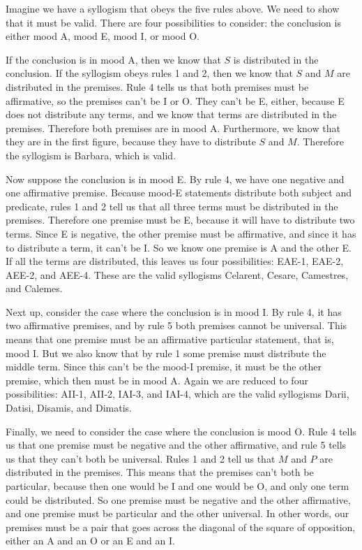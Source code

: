 Imagine we have a syllogism that obeys the five rules above. We need to show that it must be valid. There are four possibilities to consider: the conclusion is either mood A, mood E, mood I, or mood O. 

If the conclusion is in mood A, then we know that $S$ is distributed in the conclusion. If the syllogism obeys rules 1 and 2, then we know that $S$ and $M$ are distributed in the premises. Rule 4 tells us that both premises must be affirmative, so the premises can't be I or O. They can't be E, either, because E does not distribute any terms, and we know that terms are distributed in the premises. Therefore both premises are in mood A. Furthermore, we know that they are in the first figure, because they have to distribute $S$ and $M$. Therefore the syllogism is Barbara, which is valid. 

Now suppose the conclusion is in mood E. By rule 4, we have one negative and one affirmative premise. Because mood-E statements distribute both subject and predicate, rules 1 and 2 tell us that all three terms must be distributed in the premises. Therefore one premise must be E, because it will have to distribute two terms. Since E is negative, the other premise must be affirmative, and since it has to distribute a term, it can't be I. So we know one premise is A and the other E. If all the terms are distributed, this leaves us four possibilities: EAE-1, EAE-2, AEE-2, and AEE-4. These are the valid syllogisms Celarent, Cesare, Camestres, and Calemes.

Next up, consider the case where the conclusion is in mood I. By rule 4, it has two affirmative premises, and by rule 5 both premises cannot be universal. This means that one premise must be an affirmative particular statement, that is, mood I. But we also know that by rule 1 some premise must distribute the middle term. Since this can't be the mood-I premise, it must be the other premise, which then must be in mood A. Again we are reduced to four possibilities: AII-1,  AII-2, IAI-3, and IAI-4, which are the valid syllogisms Darii, Datisi, Disamis, and Dimatis.  

Finally, we need to consider the case where the conclusion is mood O. Rule 4 tells us that one premise must be negative and the other affirmative, and rule 5 tells us that they can't both be universal. Rules 1 and 2 tell us that $M$ and $P$ are distributed in the premises. This means that the premises can't both be particular, because then one would be I and one would be O, and only one term could be distributed. So one premise must be negative and the other affirmative, and one premise must be particular and the other universal. In other words, our premises must be a pair that goes across the diagonal of the square of opposition, either an A and an O or an E and an I. 

